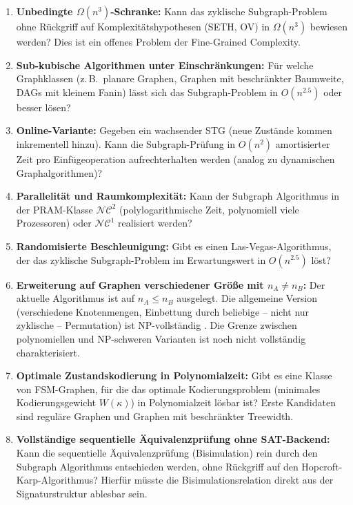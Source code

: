 ﻿\documentclass[a4paper,12pt]{article}
\theoremstyle{definition}
\begin{document}
\begin{enumerate}
  \item \textbf{Unbedingte $\Omega(n^3)$-Schranke:} Kann das zyklische Subgraph-Problem
        ohne Rückgriff auf Komplexitätshypothesen (SETH, OV) in $\Omega(n^3)$ bewiesen
        werden? Dies ist ein offenes Problem der Fine-Grained Complexity.

  \item \textbf{Sub-kubische Algorithmen unter Einschränkungen:} Für welche
        Graphklassen (z.\,B.\ planare Graphen, Graphen mit beschränkter Baumweite,
        DAGs mit kleinem Fanin) lässt sich das Subgraph-Problem in $O(n^{2.5})$ oder
        besser lösen?

  \item \textbf{Online-Variante:} Gegeben ein wachsender STG (neue Zustände kommen
        inkrementell hinzu). Kann die Subgraph-Prüfung in $O(n^2)$ amortisierter Zeit
        pro Einfügeoperation aufrechterhalten werden (analog zu dynamischen Graphalgorithmen)?

  \item \textbf{Parallelität und Raumkomplexität:} Kann der Subgraph Algorithmus
        in der PRAM-Klasse $\mathcal{NC}^2$ (polylogarithmische Zeit, polynomiell viele
        Prozessoren) oder $\mathcal{NC}^1$ realisiert werden?

  \item \textbf{Randomisierte Beschleunigung:} Gibt es einen Las-Vegas-Algorithmus, der
        das zyklische Subgraph-Problem im Erwartungswert in $O(n^{2.5})$ löst?

  \item \textbf{Erweiterung auf Graphen verschiedener Größe mit $n_A \neq n_B$:}
        Der aktuelle Algorithmus ist auf $n_A \leq n_B$ ausgelegt. Die allgemeine
        Version (verschiedene Knotenmengen, Einbettung durch beliebige -- nicht nur
        zyklische -- Permutation) ist NP-vollständig
        \cite{cook1971complexity}. Die Grenze zwischen polynomiellen und
        NP-schweren Varianten ist noch nicht vollständig charakterisiert.

  \item \textbf{Optimale Zustandskodierung in Polynomialzeit:} Gibt es eine Klasse
        von FSM-Graphen, für die das optimale Kodierungsproblem (minimales
        Kodierungsgewicht $W(\kappa)$) in Polynomialzeit lösbar ist? Erste Kandidaten
        sind reguläre Graphen und Graphen mit beschränkter Treewidth.

  \item \textbf{Vollständige sequentielle Äquivalenzprüfung ohne SAT-Backend:}
        Kann die sequentielle Äquivalenzprüfung (Bisimulation) rein durch den Subgraph
        Algorithmus entschieden werden, ohne Rückgriff auf den Hopcroft-Karp-Algorithmus?
        Hierfür müsste die Bisimulationsrelation direkt aus der Signaturstruktur
        ablesbar sein.


\end{enumerate}
\end{document}
